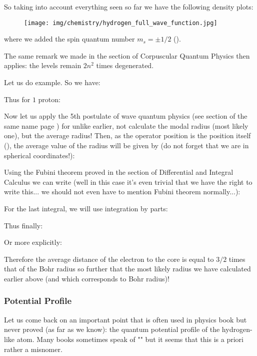 	
	So taking into account everything seen so far we have the following density plots:
	\begin{figure}[H]
		\centering
		\texttt{[image: img/chemistry/hydrogen\_full\_wave\_function.jpg]}	
	\end{figure}
	
	where we added the spin quantum number $m_s=\pm 1/2$ ().

	The same remark we made in the section of Corpuscular Quantum Physics then applies: the levels remain $2n^2$ times degenerated.

	Let us do example. So we have:
	
	Thus for $1$ proton:
	
	Now let us apply the 5th postulate of wave quantum physics (see section of the same name page \pageref{fifth postulate of wave quantum physics}) for unlike earlier, not calculate the modal radius (most likely one), but the average radius! Then, as the operator position is the position itself (), the average value of the radius will be given by (do not forget that we are in spherical coordinates!):
	
	Using the Fubini theorem proved in the section of Differential and Integral Calculus we can write (well in this case it's even trivial that we have the right to write this... we should not even have to mention Fubini theorem normally...):
	
	For the last integral, we will use integration by parts:
	
	Thus finally:
	
	Or more explicitly:
	
	Therefore the average distance of the electron to the core is equal to $3/2$ times that of the Bohr radius so further that the most likely radius we have calculated earlier above (and which corresponds to Bohr radius)!
	
	\subsubsection{Potential Profile}
	Let us come back on an important point that is often used in physics book but never proved (as far as we know): the quantum potential profile of the hydrogen-like atom. Many books sometimes speak of "" but it seems that this is a priori rather a misnomer.

